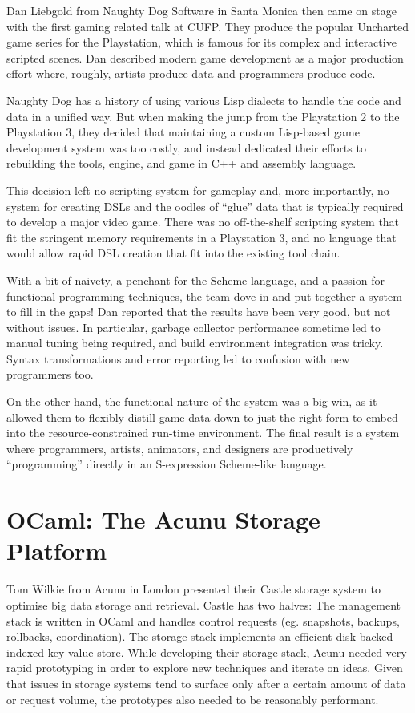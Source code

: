 \documentclass{jfp1}
\begin{document}
Dan Liebgold from Naughty Dog Software in Santa Monica then came on
stage with the first gaming related talk at CUFP. They produce the
popular Uncharted game series for the Playstation, which is famous for
its complex and interactive scripted scenes.  Dan described modern game
development as a major production effort where, roughly, artists produce
data and programmers produce code.

Naughty Dog has a history of using various Lisp dialects to handle the
code and data in a unified way. But when making the jump from the
Playstation 2 to the Playstation 3, they decided that maintaining a
custom Lisp-based game development system was too costly, and instead
dedicated their efforts to rebuilding the tools, engine, and game in C++
and assembly language.

This decision left no scripting system for gameplay and, more
importantly, no system for creating DSLs and the oodles of “glue” data
that is typically required to develop a major video game. There was no
off-the-shelf scripting system that fit the stringent memory
requirements in a Playstation 3, and no language that would allow rapid
DSL creation that fit into the existing tool chain.

With a bit of naivety, a penchant for the Scheme language, and a passion
for functional programming techniques, the team dove in and put together
a system to fill in the gaps!  Dan reported that the results have been
very good, but not without issues.  In particular, garbage collector
performance sometime led to manual tuning being required, and build
environment integration was tricky. Syntax transformations and error
reporting led to confusion with new programmers too.

On the other hand, the functional nature of the system was a big win, as
it allowed them to flexibly distill game data down to just the right
form to embed into the resource-constrained run-time environment.  The
final result is a system where programmers, artists, animators, and
designers are productively ``programming'' directly in an S-expression
Scheme-like language.

\section{OCaml: The Acunu Storage Platform}

Tom Wilkie from Acunu in London presented their Castle storage system to
optimise big data storage and retrieval. Castle has two halves: The
management stack is written in OCaml and handles control requests
(eg. snapshots, backups, rollbacks, coordination). The storage stack
implements an efficient disk-backed indexed key-value store. While
developing their storage stack, Acunu needed very rapid prototyping in
order to explore new techniques and iterate on ideas. Given that issues
in storage systems tend to surface only after a certain amount of data
or request volume, the prototypes also needed to be reasonably
performant.
\end{document}
